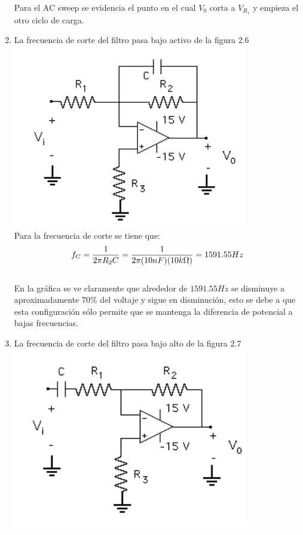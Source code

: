 \documentclass[12pt]{article}
\begin{document}
\begin{enumerate}
		\noindent Para el AC sweep se evidencia el punto en el cual $V_0$ corta a $V_{R_1}$ y empieza el otro ciclo de carga.\\
		
		\item La frecuencia de corte del filtro pasa bajo activo de la figura 2.6\\
		
		\includegraphics{Img/2_6}\\
		
		\noindent Para la frecuencia de corte se tiene que:\\
		
		\begin{equation}
			\notag f_C = \frac{1}{2\pi R_2 C} = \frac{1}{2 \pi(10nF)(10k\Omega)} = 1591.55Hz
		\end{equation}\\
	
		\noindent En la gráfica se ve claramente que alrededor de $1591.55Hz$ se disminuye a aproximadamente $70\%$ del voltaje y sigue en disminución, esto se debe a que esta configuración sólo permite que se mantenga la diferencia de potencial a bajas frecuencias.\\
		
		\item La frecuencia de corte del filtro pasa bajo alto de la figura 2.7\\
		
		\includegraphics{Img/2_7}\\
		

\end{enumerate}
\end{document}
